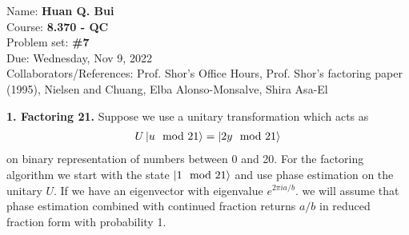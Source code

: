 \documentclass{article}
\theoremstyle{definition}
\begin{document}
\begin{framed}
\noindent Name: \textbf{Huan Q. Bui}\\
Course: \textbf{8.370 - QC}\\
Problem set: \textbf{\#7}\\
Due: Wednesday, Nov 9, 2022\\
Collaborators/References: Prof. Shor's Office Hours, Prof. Shor's factoring paper (1995), Nielsen and Chuang, Elba Alonso-Monsalve, Shira Asa-El
\end{framed}


\noindent \textbf{1. Factoring 21.} Suppose we use a unitary transformation which acts as
\begin{align*}
U \ket{u \mod 21} = \ket{2y \mod 21}
\end{align*}
on binary representation of numbers between 0 and 20. For the factoring algorithm we start with the state $\ket{1 \mod 21}$ and use phase estimation on the unitary $U$. If we have an eigenvector with eigenvalue $e^{2\pi i a/b}$. we will assume that phase estimation combined with continued fraction returns $a/b$ in reduced fraction form with probability 1.  
\end{document}
